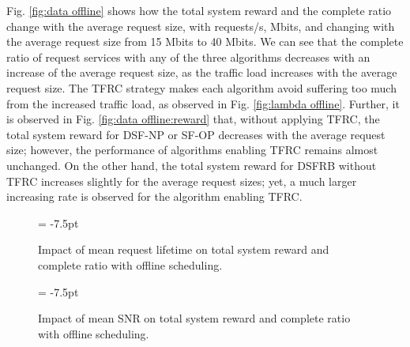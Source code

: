 \documentclass[journal,letterpaper,12pt,oneside,onecolumn,draftclsnofoot]{IEEEtran}
\begin{document}
Fig. \ref{fig:data offline} shows how the total system reward and the complete ratio change with the average request size, with  requests/s,  Mbits,  and  changing with the average request size from 15 Mbits to 40 Mbits. We can see that the complete ratio of request services with any of the three algorithms decreases with an increase of the average request size, as the traffic load increases with the average request size.
The TFRC strategy makes each algorithm avoid suffering too much from the increased traffic load, as observed in Fig. \ref{fig:lambda offline}.
Further, it is observed in Fig. \ref{fig:data offline:reward} that, without applying TFRC, the total system reward for DSF-NP or SF-OP decreases with the average request size; however, the performance of algorithms enabling TFRC remains almost unchanged. On the other hand, the total system reward for DSFRB without TFRC increases slightly for the average request sizes; yet, a much larger increasing rate is observed for the algorithm enabling TFRC. 





\begin{figure*}[tp]\subfigcapskip = -7.5pt
\centering
{}
\vspace{-0.3cm}
\caption{Impact of mean request lifetime on total system reward and complete ratio with offline scheduling.}
\vspace{-0.35cm}
\label{fig:lifetime offline}
\end{figure*}

\vspace{-0.1cm}
\begin{figure*}[tp]\subfigcapskip = -7.5pt
\centering
{}
\vspace{-0.3cm}
\caption{Impact of mean SNR on total system reward and complete ratio with offline scheduling.}
\vspace{-0.65cm}
\label{fig:snr offline}
\end{figure*}
\end{document}
